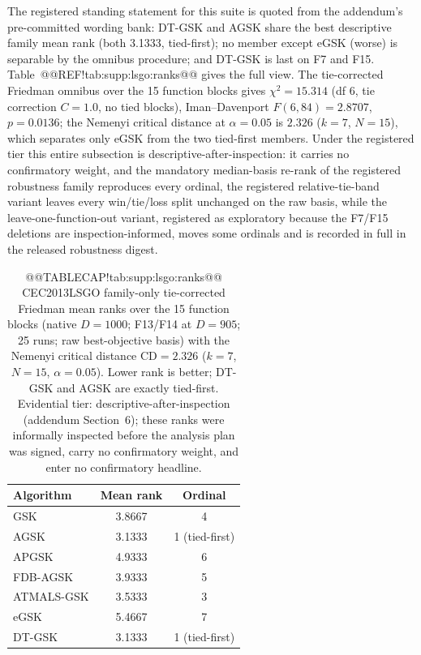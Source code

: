 \documentclass[10pt,a4paper]{article}
\newcommand{\dtgsk}{DT-GSK}
\newcommand{\agsk}{AGSK}
\newcommand{\egsk}{eGSK}
\begin{document}
The registered standing statement for this suite is quoted from the
addendum's pre-committed wording bank: \dtgsk{} and \agsk{} share the
best descriptive family mean rank (both 3.1333, tied-first); no member
except \egsk{} (worse) is separable by the omnibus procedure; and
\dtgsk{} is last on F7 and F15.  Table~@@REF!tab:supp:lsgo:ranks@@ gives
the full view.  The tie-corrected Friedman omnibus over the 15 function
blocks gives $\chi^{2} = 15.314$ (df 6, tie correction $C = 1.0$, no tied
blocks), Iman--Davenport $F(6, 84) = 2.8707$, $p = 0.0136$; the Nemenyi
critical distance at $\alpha = 0.05$ is $2.326$ ($k = 7$, $N = 15$),
which separates only \egsk{} from the two tied-first members.  Under the
registered tier this entire subsection is descriptive-after-inspection:
it carries no confirmatory weight, and the mandatory median-basis re-rank
of the registered robustness family reproduces every ordinal, the
registered relative-tie-band variant leaves every win/tie/loss split
unchanged on the raw basis, while the
leave-one-function-out variant, registered as exploratory because the
F7/F15 deletions are inspection-informed, moves some ordinals and is
recorded in full in the released robustness digest.




\begin{table}[H]
\caption{@@TABLECAP!tab:supp:lsgo:ranks@@ CEC2013LSGO family-only tie-corrected Friedman mean ranks over
the 15 function blocks (native $D = 1000$; F13/F14 at $D = 905$; 25 runs;
raw best-objective basis) with the Nemenyi critical distance
$\mathrm{CD} = 2.326$ ($k = 7$, $N = 15$, $\alpha = 0.05$).  Lower rank
is better; \dtgsk{} and \agsk{} are exactly tied-first.  Evidential
tier: descriptive-after-inspection (addendum Section~6); these ranks
were informally inspected before the analysis plan was signed, carry no
confirmatory weight, and enter no confirmatory headline.
}\label{tab:supp:lsgo:ranks}


\zebra
\begin{tabular}{lcc}
\toprule
\textbf{Algorithm} & \textbf{Mean rank} & \textbf{Ordinal} \\
\midrule
GSK & 3.8667 & 4 \\
AGSK & 3.1333 & 1 (tied-first) \\
APGSK & 4.9333 & 6 \\
FDB-AGSK & 3.9333 & 5 \\
ATMALS-GSK & 3.5333 & 3 \\
eGSK & 5.4667 & 7 \\
DT-GSK & 3.1333 & 1 (tied-first) \\
\bottomrule
\end{tabular}
\end{table}
\end{document}
